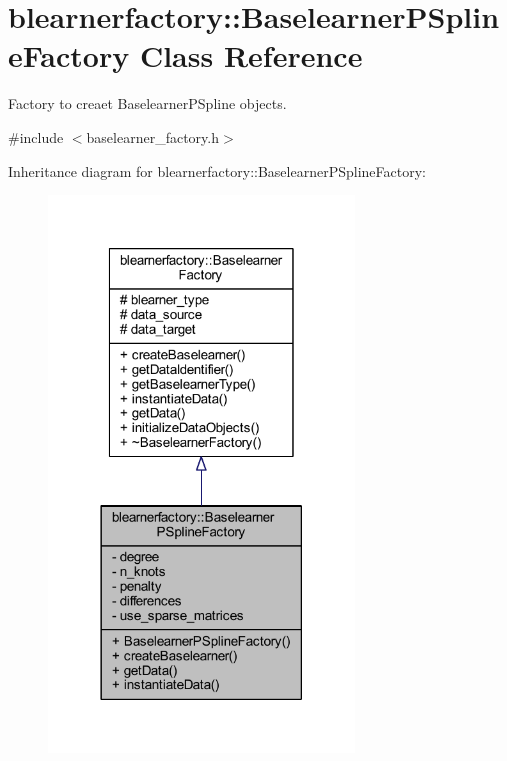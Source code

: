 \hypertarget{classblearnerfactory_1_1_baselearner_p_spline_factory}{}\section{blearnerfactory\+:\+:Baselearner\+P\+Spline\+Factory Class Reference}
\label{classblearnerfactory_1_1_baselearner_p_spline_factory}


Factory to creaet {\ttfamily Baselearner\+P\+Spline} objects.  




{\ttfamily \#include $<$baselearner\+\_\+factory.\+h$>$}



Inheritance diagram for blearnerfactory\+:\+:Baselearner\+P\+Spline\+Factory\+:\nopagebreak
\begin{figure}[H]
\begin{center}
\leavevmode
\includegraphics[width=230pt]{classblearnerfactory_1_1_baselearner_p_spline_factory__inherit__graph}
\end{center}
\end{figure}


